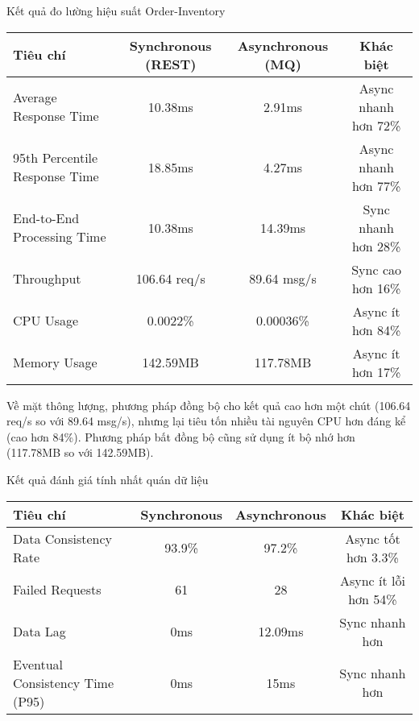 \begin{table}[h]{Kết quả đo lường hiệu suất Order-Inventory}
    \centering
    {\setlength{\arrayrulewidth}{1pt}
    \renewcommand{\arraystretch}{1.5}
    \begin{tabular}{|l|c|c|c|}
        \hline
        \textbf{Tiêu chí}             & \textbf{Synchronous (REST)} & \textbf{Asynchronous (MQ)} & \textbf{Khác biệt}   \\
        \hline
        Average Response Time         & 10.38ms                     & 2.91ms                     & Async nhanh hơn 72\% \\
        95th Percentile Response Time & 18.85ms                     & 4.27ms                     & Async nhanh hơn 77\% \\
        End-to-End Processing Time    & 10.38ms                     & 14.39ms                    & Sync nhanh hơn 28\%  \\
        Throughput                    & 106.64 req/s                & 89.64 msg/s                & Sync cao hơn 16\%    \\
        CPU Usage                     & 0.0022\%                    & 0.00036\%                  & Async ít hơn 84\%    \\
        Memory Usage                  & 142.59MB                    & 117.78MB                   & Async ít hơn 17\%    \\
        \hline
    \end{tabular}}
\end{table}

Về mặt thông lượng, phương pháp đồng bộ cho kết quả cao hơn một chút (106.64 req/s so với 89.64 msg/s), nhưng lại tiêu tốn nhiều tài nguyên CPU hơn đáng kể (cao hơn 84\%). Phương pháp bất đồng bộ cũng sử dụng ít bộ nhớ hơn (117.78MB so với 142.59MB).


\begin{table}[h]{Kết quả đánh giá tính nhất quán dữ liệu}
    \centering
    {\setlength{\arrayrulewidth}{1pt}
    \renewcommand{\arraystretch}{1.5}
    \begin{tabular}{|l|c|c|c|}
        \hline
        \textbf{Tiêu chí}               & \textbf{Synchronous} & \textbf{Asynchronous} & \textbf{Khác biệt}    \\
        \hline
        Data Consistency Rate           & 93.9\%               & 97.2\%                & Async tốt hơn 3.3\%   \\
        Failed Requests                 & 61                   & 28                    & Async ít lỗi hơn 54\% \\
        Data Lag                        & 0ms                  & 12.09ms               & Sync nhanh hơn        \\
        Eventual Consistency Time (P95) & 0ms                  & 15ms                  & Sync nhanh hơn        \\
        \hline
    \end{tabular}}
\end{table}

